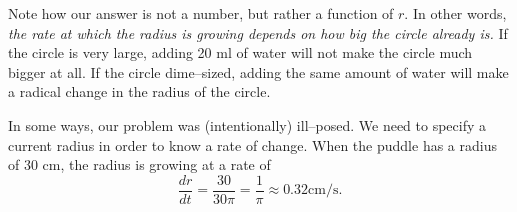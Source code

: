 {\begin{enumerate}
Note how our answer is not a number, but rather a function of $r$. In other words, \textit{the rate at which the radius is growing depends on how big the circle already is.} If the circle is very large, adding 20 ml of water will not make the circle much bigger at all. If the circle dime--sized, adding the same amount of water will make a radical change in the radius of the circle.

In some ways, our problem was (intentionally) ill--posed. We need to specify a current radius in order to know a rate of change. When the puddle has a radius of 30 cm, the radius is growing at a rate of 
\[
\frac{dr}{dt} = \frac{30}{30\pi} = \frac{1}{\pi} \approx 0.32\text{cm/s}.
\]
 
\end{enumerate}
\baselineskip
}\\

\medskip

